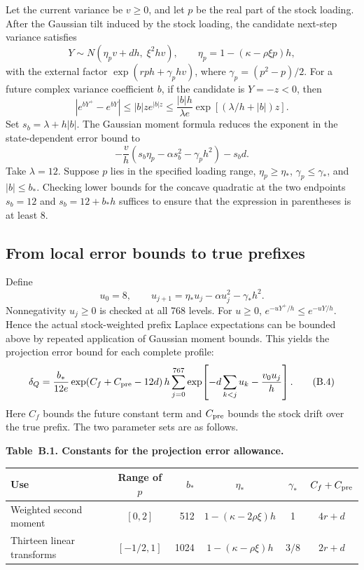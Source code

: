 Let the current variance be \(v\ge0\), and let \(p\) be the real part of the stock loading. After the Gaussian tilt induced by the stock loading, the candidate next-step variance satisfies
\[
Y\sim N(\eta_pv+dh,\;\xi^2hv),\qquad
\eta_p=1-(\kappa-\rho\xi p)h,
\]
with the external factor \(\exp(rph+\gamma_p hv)\), where \(\gamma_p=(p^2-p)/2\). For a future complex variance coefficient \(b\), if the candidate is \(Y=-z<0\), then
\[
|e^{bY^+}-e^{bY}|
\le |b|z e^{|b|z}
\le \frac{|b|h}{\lambda e}
\exp[(\lambda/h+|b|)z].
\tag{B.1}
\]
Set \(s_b=\lambda+h|b|\). The Gaussian moment formula reduces the exponent in the state-dependent error bound to
\[
-\frac v h\left(s_b\eta_p-\alpha s_b^2-\gamma_ph^2\right)-s_bd.
\tag{B.2}
\]
Take \(\lambda=12\). Suppose \(p\) lies in the specified loading range, \(\eta_p\ge\eta_*\), \(\gamma_p\le\gamma_*\), and \(|b|\le b_*\). Checking lower bounds for the concave quadratic at the two endpoints \(s_b=12\) and \(s_b=12+b_*h\) suffices to ensure that the expression in parentheses is at least 8.

\subsection{From local error bounds to true prefixes}

Define
\[
u_0=8,\qquad u_{j+1}=\eta_*u_j-\alpha u_j^2-\gamma_*h^2.
\tag{B.3}
\]
Nonnegativity \(u_j\ge0\) is checked at all 768 levels. For \(u\ge0\), \(e^{-uY^+/h}\le e^{-uY/h}\). Hence the actual stock-weighted prefix Laplace expectations can be bounded above by repeated application of Gaussian moment bounds. This yields the projection error bound for each complete profile:
\[
\delta_Q=
\frac{b_*}{12e}\exp(C_f+C_{\rm pre}-12d)\,
h\sum_{j=0}^{767}
\exp\!\left[-d\sum_{k<j}u_k-\frac{v_0u_j}{h}\right].
\tag{B.4}
\]
Here \(C_f\) bounds the future constant term and \(C_{\rm pre}\) bounds the stock drift over the true prefix. The two parameter sets are as follows.

\noindent\textbf{Table~B.1. Constants for the projection error allowance.}

\begingroup
\small
\setlength{\tabcolsep}{3pt}
\renewcommand{\arraystretch}{1.2}
\begin{tabularx}{\textwidth}{@{}>{\raggedright\arraybackslash}X c r c c c@{}}
\toprule
Use & Range of \(p\) & \(b_*\) & \(\eta_*\) & \(\gamma_*\) & \(C_f+C_{\rm pre}\) \\
\midrule
Weighted second moment & \([0,2]\) & 512 & \(1-(\kappa-2\rho\xi)h\) & 1 & \(4r+d\) \\
Thirteen linear transforms & \([-1/2,1]\) & 1024 & \(1-(\kappa-\rho\xi)h\) & \(3/8\) & \(2r+d\) \\
\bottomrule
\end{tabularx}
\endgroup

